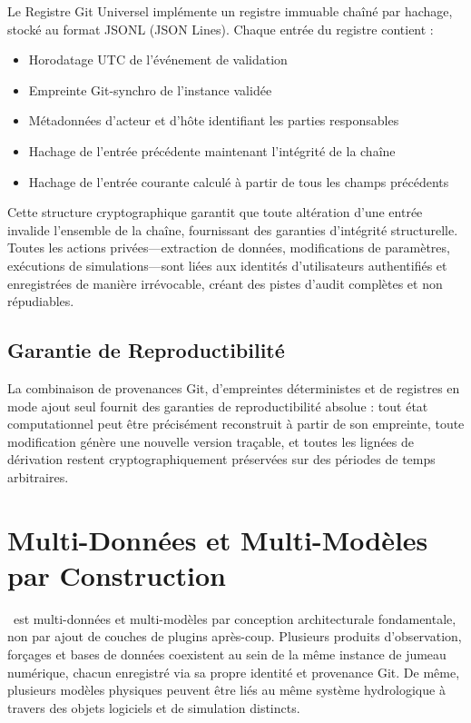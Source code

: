 Le Registre Git Universel implémente un registre immuable chaîné par hachage, stocké au format JSONL (JSON Lines). Chaque entrée du registre contient :
\begin{itemize}
\item Horodatage UTC de l'événement de validation
\item Empreinte Git-synchro de l'instance validée
\item Métadonnées d'acteur et d'hôte identifiant les parties responsables
\item Hachage de l'entrée précédente maintenant l'intégrité de la chaîne
\item Hachage de l'entrée courante calculé à partir de tous les champs précédents
\end{itemize}

Cette structure cryptographique garantit que toute altération d'une entrée invalide l'ensemble de la chaîne, fournissant des garanties d'intégrité structurelle. Toutes les actions privées---extraction de données, modifications de paramètres, exécutions de simulations---sont liées aux identités d'utilisateurs authentifiés et enregistrées de manière irrévocable, créant des pistes d'audit complètes et non répudiables.

\subsection*{Garantie de Reproductibilité}

La combinaison de provenances Git, d'empreintes déterministes et de registres en mode ajout seul fournit des garanties de reproductibilité absolue : tout état computationnel peut être précisément reconstruit à partir de son empreinte, toute modification génère une nouvelle version traçable, et toutes les lignées de dérivation restent cryptographiquement préservées sur des périodes de temps arbitraires.

\section*{Multi-Données et Multi-Modèles par Construction}

\hydrot\ est multi-données et multi-modèles par conception architecturale fondamentale, non par ajout de couches de plugins après-coup. Plusieurs produits d'observation, forçages et bases de données coexistent au sein de la même instance de jumeau numérique, chacun enregistré via sa propre identité et provenance Git. De même, plusieurs modèles physiques peuvent être liés au même système hydrologique à travers des objets logiciels et de simulation distincts.

